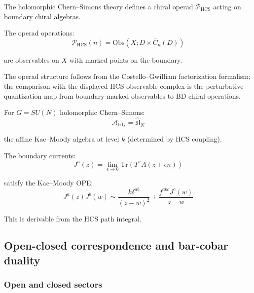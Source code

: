 \begin{remark}
\label{rem:chiral-operad-hcs}
The holomorphic Chern--Simons theory defines a chiral operad $\mathcal{P}_{\text{HCS}}$
acting on boundary chiral algebras.

The operad operations:
\[\mathcal{P}_{\text{HCS}}(n) = \text{Obs}(X; D \times \overline{C}_n(D))\]

are observables on $X$ with marked points on the boundary.
\end{remark}

\begin{remark}
The operad structure follows from the Costello--Gwilliam factorization
formalism; the comparison with the displayed HCS observable complex is
the perturbative quantization map from boundary-marked observables to
BD chiral operations.
\end{remark}

\begin{example}
For $G = SU(N)$ holomorphic Chern--Simons:
\[\mathcal{A}_{\text{bdy}} = \widehat{\mathfrak{sl}}_N\]

the affine Kac--Moody algebra at level $k$ (determined by HCS coupling).

The boundary currents:
\[J^a(z) = \lim_{\epsilon \to 0} \text{Tr}(T^a A(z + \epsilon n))\]

satisfy the Kac--Moody OPE:
\[J^a(z) J^b(w) \sim \frac{k \delta^{ab}}{(z-w)^2} +
\frac{f^{abc} J^c(w)}{z-w}\]

This is derivable from the HCS path integral.
\end{example}

\subsection{Open-closed correspondence and bar-cobar duality}

\subsubsection{Open and closed sectors}

